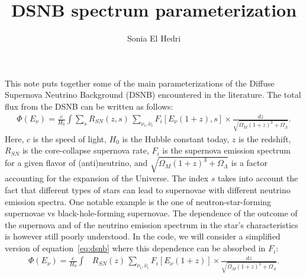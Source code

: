 \documentclass[12pt]{article}
\title{DSNB spectrum parameterization}
\author{Sonia El Hedri}
\begin{document}
\maketitle
This note puts together some of the main parameterizations of the Diffuse Supernova Neutrino Background (DSNB) encountered in the literature. The total flux from the DSNB can be written as follows:
\begin{align}
    \Phi(E_\nu) = \frac{c}{H_0}\int \sum_{s}  R_{SN}(z, s)\, \sum_{\nu_i,\bar\nu_i} F_{i}\left[E_\nu (1 + z), s\right] \times \frac{dz}{\sqrt{\Omega_M(1+z)^3 + \Omega_\Lambda}}.
    \label{eq:dsnb}
\end{align}
Here, $c$ is the speed of light, $H_0$ is the Hubble constant today, $z$ is the redshift, $R_{SN}$ is the core-collapse supernova rate, $F_i$ is the supernova emission spectrum for a given flavor of (anti)neutrino, and $\sqrt{\Omega_M(1+z)^3 + \Omega_\Lambda}$ is a factor accounting for the expansion of the Universe. The index $s$ takes into account the fact that different types of stars can lead to supernovae with different neutrino emission spectra. One notable example is the one of neutron-star-forming supernovae vs black-hole-forming supernovae. The dependence of the outcome of the supernova and of the neutrino emission spectrum in the star's characteristics is however still poorly understood. In the code, we will consider a simplified version of equation~\ref{eq:dsnb} where this dependence can be absorbed in $F_i$:
\begin{align}
    \Phi(E_\nu) = \frac{c}{H_0}\int & R_{SN}(z)\, \sum_{\nu_i,\bar\nu_i} F_{i}\left[E_\nu (1 + z)\right] \times \frac{dz}{\sqrt{\Omega_M(1+z)^3 + \Omega_\Lambda}}.
    \label{eq:dsnb:simplified}
\end{align}
\end{document}
